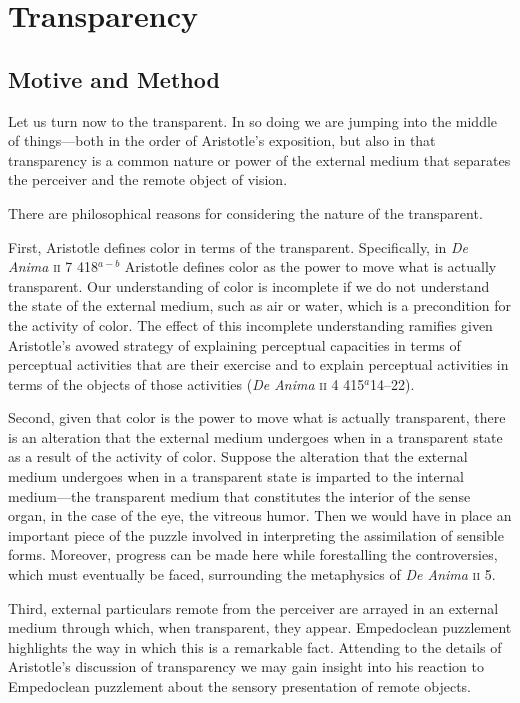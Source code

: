 \chapter{Transparency} %
\label{cha:transparency}

\section{Motive and Method} %
\label{sec:motive_and_method}

Let us turn now to the transparent. In so doing we are jumping into the middle of things---both in the order of Aristotle's exposition, but also in that transparency is a common nature or power of the external medium that separates the perceiver and the remote object of vision.

There are philosophical reasons for considering the nature of the transparent.

First, Aristotle defines color in terms of the transparent. Specifically, in \emph{De Anima} \textsc{ii} 7 418\( ^{a-b} \) Aristotle defines color as the power to move what is actually transparent. Our understanding of color is incomplete if we do not understand the state of the external medium, such as air or water, which is a precondition for the activity of color. The effect of this incomplete understanding ramifies given Aristotle's avowed strategy of explaining perceptual capacities in terms of perceptual activities that are their exercise and to explain perceptual activities in terms of the objects of those activities (\emph{De Anima} \textsc{ii} 4 415\( ^{a} \)14--22).

Second, given that color is the power to move what is actually transparent, there is an alteration that the external medium undergoes when in a transparent state as a result of the activity of color. Suppose the alteration that the external medium undergoes when in a transparent state is imparted to the internal medium---the transparent medium that constitutes the interior of the sense organ, in the case of the eye, the vitreous humor. Then we would have in place an important piece of the puzzle involved in interpreting the assimilation of sensible forms. Moreover, progress can be made here while forestalling the controversies, which must eventually be faced, surrounding the metaphysics of \emph{De Anima} \textsc{ii} 5.

Third, external particulars remote from the perceiver are arrayed in an external medium through which, when transparent, they appear. Empedoclean puzzlement highlights the way in which this is a remarkable fact. Attending to the details of Aristotle's discussion of transparency we may gain insight into his reaction to Empedoclean puzzlement about the sensory presentation of remote objects.

